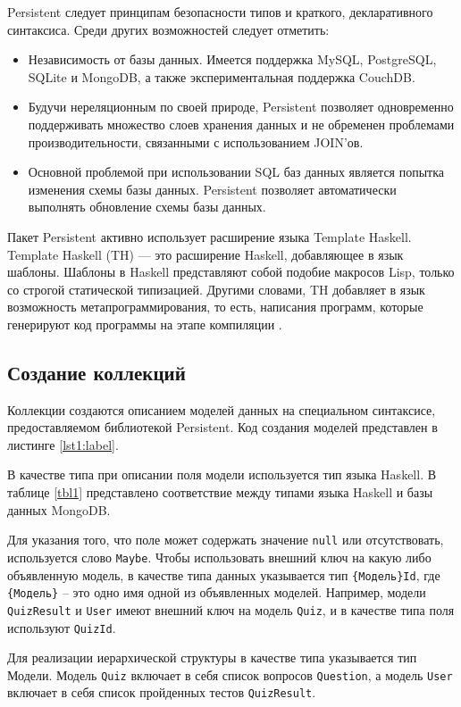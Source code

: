 Persistent следует принципам безопасности типов и краткого, декларативного синтаксиса. Среди других возможностей следует отметить:

\begin{itemize}
	\item Независимость от базы данных. Имеется поддержка MySQL, PostgreSQL, SQLite и MongoDB, а также экспериментальная поддержка CouchDB.
	\item Будучи нереляционным по своей природе, Persistent позволяет одновременно поддерживать множество слоев хранения данных и не обременен проблемами производительности, связанными с использованием JOIN’ов.
	\item Основной проблемой при использовании SQL баз данных является попытка изменения схемы базы данных. Persistent позволяет автоматически выполнять обновление схемы базы данных.
\end{itemize}

Пакет Persistent активно использует расширение языка Template Haskell. Template Haskell (TH) — это расширение Haskell, добавляющее в язык шаблоны. Шаблоны в Haskell представляют собой подобие макросов Lisp, только со строгой статической типизацией. Другими словами, TH добавляет в язык возможность метапрограммирования, то есть, написания программ, которые генерируют код программы на этапе компиляции \cite{p}. 

\subsection{Создание коллекций}
Коллекции создаются описанием моделей данных на специальном синтаксисе, предоставляемом библиотекой Persistent. Код создания моделей представлен в листинге \ref{lst1:label}.

В качестве типа при описании поля модели используется тип языка Haskell. В таблице \ref{tbl1} представлено соответствие между типами языка Haskell и базы данных MongoDB.

Для указания того, что поле может содержать значение \texttt{null} или отсутствовать, используется слово \texttt{Maybe}. Чтобы использовать внешний ключ на какую либо объявленную модель, в качестве типа данных указывается тип \texttt{\{Модель\}Id}, где \texttt{\{Модель\}} -- это одно имя одной из объявленных моделей. Например, модели \texttt{QuizResult} и \texttt{User} имеют внешний ключ на модель \texttt{Quiz}, и в качестве типа поля используют \texttt{QuizId}. 

Для реализации иерархической структуры в качестве типа указывается тип Модели. Модель \texttt{Quiz} включает в себя список вопросов \texttt{Question}, а модель \texttt{User} включает в себя список пройденных тестов \texttt{QuizResult}.

